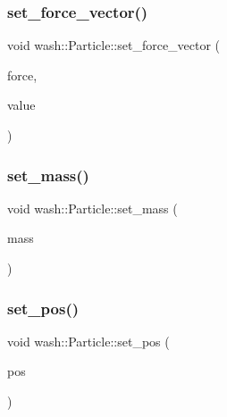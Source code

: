 \mbox{\label{classwash_1_1Particle_a6960cdd169d1829a52e49cf835a8bfeb}} 
\subsubsection{\texorpdfstring{set\+\_\+force\+\_\+vector()}{set\_force\_vector()}}
{\footnotesize\ttfamily void wash\+::\+Particle\+::set\+\_\+force\+\_\+vector (\begin{DoxyParamCaption}\item[{const std\+::string \&}]{force,  }\item[{const \mbox{\hyperlink{namespacewash_ab2cbbc37941b733095c9225b49b4cad9}{Simulation\+VecT}}}]{value }\end{DoxyParamCaption})}

\mbox{\label{classwash_1_1Particle_a9151ed34c880f63f062381076834223e}} 
\subsubsection{\texorpdfstring{set\+\_\+mass()}{set\_mass()}}
{\footnotesize\ttfamily void wash\+::\+Particle\+::set\+\_\+mass (\begin{DoxyParamCaption}\item[{const double}]{mass }\end{DoxyParamCaption})}

\mbox{\label{classwash_1_1Particle_af06835533935c04e594c258a7dcdd1ef}} 
\subsubsection{\texorpdfstring{set\+\_\+pos()}{set\_pos()}}
{\footnotesize\ttfamily void wash\+::\+Particle\+::set\+\_\+pos (\begin{DoxyParamCaption}\item[{const \mbox{\hyperlink{namespacewash_ab2cbbc37941b733095c9225b49b4cad9}{Simulation\+VecT}}}]{pos }\end{DoxyParamCaption})}

